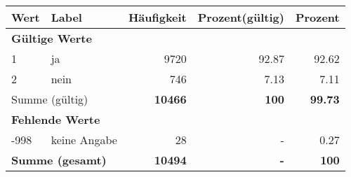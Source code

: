      \begin{longtable}{lXrrr}
     \toprule
     \textbf{Wert} & \textbf{Label} & \textbf{Häufigkeit} & \textbf{Prozent(gültig)} & \textbf{Prozent} \\
     \endhead
     \midrule
     \multicolumn{5}{l}{\textbf{Gültige Werte}}\\

     1 &
     \multicolumn{1}{X}{ ja   } &


       \num{9720} &
       \num[round-mode=places,round-precision=2]{92,87} &
         \num[round-mode=places,round-precision=2]{92,62} \\

     2 &
     \multicolumn{1}{X}{ nein   } &


       \num{746} &
       \num[round-mode=places,round-precision=2]{7,13} &
         \num[round-mode=places,round-precision=2]{7,11} \\
     \midrule
     \multicolumn{2}{l}{Summe (gültig)} &
       \textbf{\num{10466}} &
     \textbf{100} &
       \textbf{\num[round-mode=places,round-precision=2]{99,73}} \\
     \multicolumn{5}{l}{\textbf{Fehlende Werte}}\\
       -998 &
       keine Angabe &
         \num{28} &
        - &
         \num[round-mode=places,round-precision=2]{0,27} \\
     \midrule
     \multicolumn{2}{l}{\textbf{Summe (gesamt)}} &
          \textbf{\num{10494}} &
        \textbf{-} &
        \textbf{100} \\
     \bottomrule
     \end{longtable}
     
